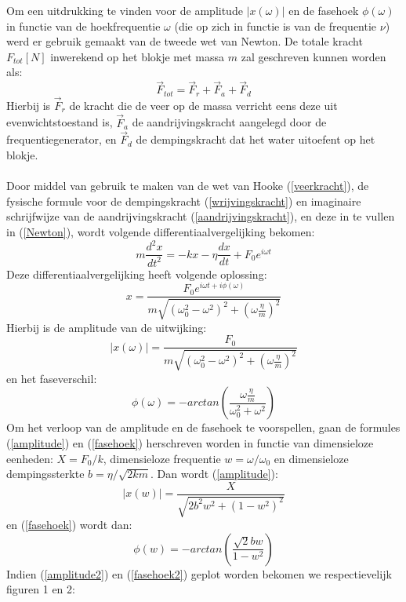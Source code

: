 \documentclass[12pt,a4]{article}
\begin{document}
Om een uitdrukking te vinden voor de amplitude $|x(\omega)|$ en de fasehoek $\phi(\omega)$ in functie van de hoekfrequentie $\omega$ (die op zich in functie is van de frequentie $\nu$) werd er gebruik gemaakt van de tweede wet van Newton. De totale kracht $F_{tot} [N]$ inwerekend op het blokje met massa $m$ zal geschreven kunnen worden als:
\begin{equation}
\label{Newton}
\vec{F}_{tot} = \vec{F}_{r} + \vec{F}_{a} + \vec{F}_{d}
\end{equation}
Hierbij is $\vec{F}_{r}$ de kracht die de veer op de massa verricht eens deze uit evenwichtstoestand is, $\vec{F}_{a}$ de aandrijvingskracht aangelegd door de frequentiegenerator, en $\vec{F}_{d}$ de dempingskracht dat het water uitoefent op het blokje.\\ \\
Door middel van gebruik te maken van de wet van Hooke (\ref{veerkracht}), de fysische formule voor de dempingskracht (\ref{wrijvingskracht}) en imaginaire schrijfwijze van de aandrijvingskracht (\ref{aandrijvingskracht}), en deze in te vullen in (\ref{Newton}), wordt volgende differentiaalvergelijking bekomen:
\begin{equation}
\label{diffvgl}
m\frac{d^2x}{dt^2} = -kx - \eta\frac{dx}{dt} + F_0e^{i\omega t}
\end{equation}
Deze differentiaalvergelijking heeft volgende oplossing:
\begin{equation}
\label{oplossing}
x = \frac{F_0 e^{i\omega t + i\phi (\omega)}}{m\sqrt{(\omega^2_0-\omega^2)^2 + (\omega \frac{\eta}{m})^2}}
\end{equation}
Hierbij is de amplitude van de uitwijking:
\begin{equation}
\label{amplitude}
|x(\omega)| = \frac{F_0}{m\sqrt{(\omega_0^2-\omega^2)^2+(\omega\frac{\eta}{m})^2}} 
\end{equation}
en het faseverschil:
\begin{equation}
\label{fasehoek}
\phi(\omega) = -arctan\left(\frac{\omega\frac{\eta}{m}}{\omega_0^2+\omega^2}\right)
\end{equation}
Om het verloop van de amplitude en de fasehoek te voorspellen, gaan de formules (\ref{amplitude}) en (\ref{fasehoek})  herschreven worden in functie van dimensieloze eenheden: $X = F_0/k$, dimensieloze frequentie $w = \omega/\omega_0$ en dimensieloze dempingssterkte $b = \eta/\sqrt{2km}$.
Dan wordt (\ref{amplitude}):
\begin{equation}
\label{amplitude2}
|x(w)| = \frac{X}{\sqrt{2b^2w^2+(1-w^2)^2}}
\end{equation}
en (\ref{fasehoek}) wordt dan:
\begin{equation}
\label{fasehoek2}
\phi(w) = -arctan\left(\frac{\sqrt{2}bw}{1-w^2}\right)
\end{equation}
Indien (\ref{amplitude2}) en (\ref{fasehoek2}) geplot worden bekomen we respectievelijk figuren 1 en 2:
\end{document}

